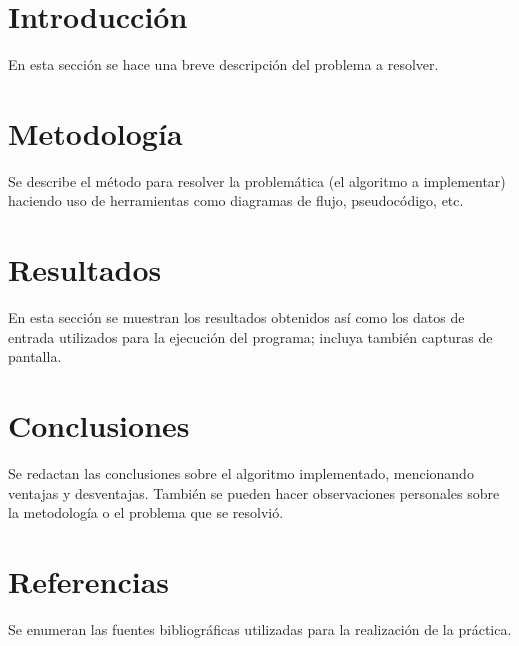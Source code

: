 \documentclass[11pt]{article}
\begin{document}
\section*{Introducción}

En esta sección se hace una breve descripción del problema a resolver.

\section*{Metodología}

Se describe el método para resolver la problemática (el algoritmo a implementar) haciendo uso de herramientas como diagramas de flujo, pseudocódigo, etc.

\section*{Resultados}

En esta sección se muestran los resultados obtenidos así como los datos de entrada utilizados para la ejecución del programa; incluya también capturas de pantalla.

\section*{Conclusiones}

Se redactan las conclusiones sobre el algoritmo implementado, mencionando ventajas y desventajas. También se pueden hacer observaciones personales sobre la metodología o el problema que se resolvió.

\section*{Referencias}
Se enumeran las fuentes bibliográficas utilizadas para la realización de la práctica.
\end{document}
